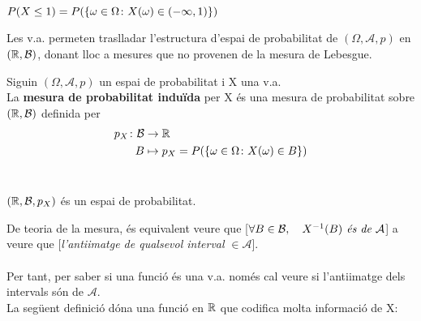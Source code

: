 \begin{example}
  $P(X\leq 1) = P(\left\{\omega \in \Omega \colon X(\omega) \in (-\infty, 1)\right\})$\\
\end{example}

Les v.a. permeten traslladar l'estructura d'espai de probabilitat de $(\Omega, \mathcal{A}, p)$ en $(\mathbb{R}, \mathcal{B})$, donant lloc a mesures que no provenen de la mesura de Lebesgue.\\

\newpage

\begin{defi}
  Siguin $(\Omega, \mathcal{A}, p)$ un espai de probabilitat i X una v.a. \\
  La \textbf{mesura de probabilitat induïda} per X és una mesura de probabilitat sobre $(\mathbb{R}, \mathcal{B})$ definida per
  \[
    \begin{aligned}
      p_{X} \colon \mathcal{B} &\to \mathbb{R} \\
      B &\mapsto p_{X} = P(\left\{\omega \in \Omega \colon X(\omega) \in B\right\})
    \end{aligned}
  \]
  \\
\end{defi}

\begin{obs}
  $(\mathbb{R}, \mathcal{B},p_{X})$ és un espai de probabilitat.
\end{obs}

De teoria de la mesura, és equivalent veure que [$\forall B \in \mathcal{B}, \quad X^{-1}(B) \textit{ és de } \mathcal{A}$] a veure que [\textit{l'antiimatge de qualsevol interval} $\in \mathcal{A}$].\\\\
Per tant, per saber si una funció és una v.a. només cal veure si l'antiimatge dels intervals són de $\mathcal{A}$.\\

La següent definició dóna una funció en $\mathbb{R}$ que codifica molta informació de X:

\begin{defi}
  
\end{defi}
